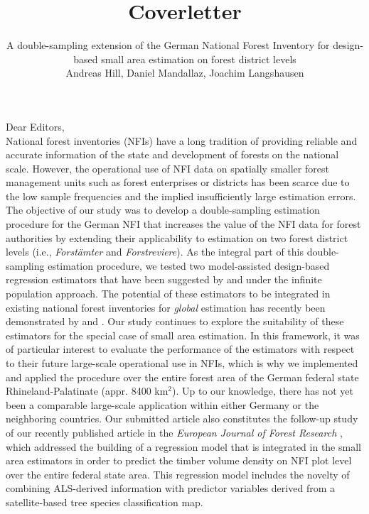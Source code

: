 \documentclass{article}
\title{Coverletter}
\author{A double-sampling extension of the German National Forest Inventory for design-based small area estimation on forest district levels\\
Andreas Hill, Daniel Mandallaz, Joachim Langshausen}
\begin{document}

\maketitle
\thispagestyle{empty}
\newpage
\thispagestyle{empty}

\setlength{\headsep}{15mm}


Dear Editors,\\

National forest inventories (NFIs) have a long tradition of providing reliable and accurate information of the state and development of forests on the national scale. However, the operational use of NFI data on spatially smaller forest management units such as forest enterprises or districts has been scarce due to the low sample frequencies and the implied insufficiently large estimation errors. The objective of our study was to develop a double-sampling estimation procedure for the German NFI that increases the value of the NFI data for forest authorities by extending their applicability to estimation on two forest district levels (i.e., \textit{Forst{\"a}mter} and \textit{Forstreviere}). As the integral part of this double-sampling estimation procedure, we tested two model-assisted design-based regression estimators that have been suggested by \citet{mandallaz2013a} and \citet{mandallaz2013b} under the infinite population approach. The potential of these estimators to be integrated in existing national forest inventories for \textit{global} estimation has recently been demonstrated by \cite{massey2014a} and \citet{massey2015b}. Our study continues to explore the suitability of these estimators for the special case of small area estimation. In this framework, it was of particular interest to evaluate the performance of the estimators with respect to their future large-scale operational use in NFIs, which is why we implemented and applied the procedure over the entire forest area of the German federal state Rhineland-Palatinate (appr. 8400 km$^2$). Up to our knowledge, there has not yet been a comparable large-scale application within either Germany or the neighboring countries. Our submitted article also constitutes the follow-up study of our recently published article in the \textit{European Journal of Forest Research} \citep{hill2017a}, which addressed the building of a regression model that is integrated in the small area estimators in order to predict the timber volume density on NFI plot level over the entire federal state area. This regression model includes the novelty of combining ALS-derived information with predictor variables derived from a satellite-based tree species classification map.\\
\end{document}
